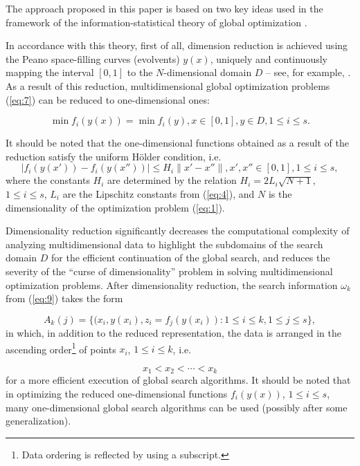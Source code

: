 \documentclass[review]{elsarticle}
\begin{document}
The approach proposed in this paper is based on two key ideas used in the framework of the information-statistical theory of global optimization \cite{c5}.

In accordance with this theory, first of all, dimension reduction is achieved using the Peano space-filling curves (evolvents) $y(x)$, uniquely and continuously mapping the interval $[0,1]$ to the $N$-dimensional domain $D$ -- see, for example, \cite{c5,c21}. As a result of this reduction, multidimensional global optimization problems (\ref{eq:7}) can be reduced to one-dimensional ones: 

\begin{equation}\label{eq:11}
\min {f_i (y(x))} = \min{f_i (y)}, x \in [0,1], y \in D, 1 \leq i \leq s.
\end{equation}

It should be noted that the one-dimensional functions obtained as a result of the reduction satisfy the uniform H\"older condition, i.e.
\begin{equation}\label{eq:12}
|f_i (y(x'))-f_i (y(x''))| \leq H_i \|x'-x''\|, x',x''\in [0,1], 1 \leq i \leq s,
\end{equation}
where the constants $H_i$ are determined by the relation $H_i = 2L_i \sqrt{N+1}$, ${1 \leq i \leq s}$, $L_i$ are the Lipschitz constants from (\ref{eq:4}), and $N$ is the dimensionality of the optimization problem (\ref{eq:1}).

Dimensionality reduction significantly decreases the computational complexity of analyzing multidimensional data to highlight the subdomains of the search domain $D$ for the efficient continuation of the global search, and reduces the severity of the ``curse of dimensionality'' problem in solving multidimensional optimization problems. After dimensionality reduction, the search information $\omega_k$ from (\ref{eq:9}) takes the form

\begin{equation}\label{eq:13}
A_k (j)=\{ (x_i, y(x_i), z_i=f_j (y(x_i) ): 1 \leq i \leq k,1 \leq j \leq s \},
\end{equation}
in which, in addition to the reduced representation, the data is arranged in the ascending order\footnote{Data ordering is reflected by using a subscript.} of points $x_i$,  $1 \leq i \leq k$, i.e.

\begin{equation}\label{eq:14}
x_1< x_2< \cdots < x_k
\end{equation}
for a more efficient execution of global search algorithms. It should be noted that in optimizing the reduced one-dimensional functions $f_i (y(x))$, $1 \leq i \leq s$, many one-dimensional global search algorithms can be used (possibly after some generalization).
\end{document}
